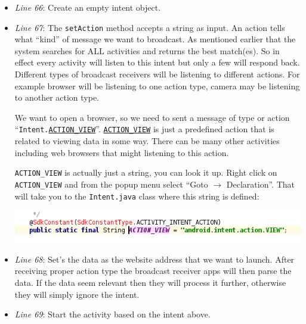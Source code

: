 \begin{itemize}
	\item \textit{Line 66}: Create an empty intent object.
	
	\item \textit{Line 67}: The \texttt{setAction} method accepts a string as input. An action tells what ``kind'' of message we want to broadcast. As mentioned earlier that the system searches for ALL activities and returns the best match(es). So in effect every activity will listen to this intent but only a few will respond back. Different types of broadcast receivers will be listening to different actions. For example browser will be listening to one action type,
	camera may be listening to another action type.
	
	We want to open a browser, so we need to sent a message of type or action
	``\texttt{Intent.}\href{https://developer.android.com/reference/android/content/Intent.html#ACTION_VIEW}{\texttt{ACTION\_VIEW}}''. \href{https://developer.android.com/reference/android/content/Intent.html#ACTION_VIEW}{\texttt{ACTION\_VIEW}} is just a predefined action that is related to viewing data in some way. There can be many other activities including web browsers that might listening to this action. 
	
	\texttt{ACTION\_VIEW} is actually just a string, you can look it up. Right click on \texttt{ACTION\_VIEW} and from the popup menu select ``Goto $\rightarrow$ Declaration''. That will take you to the \texttt{Intent.java} class where this string is defined:
	
	\begin{center}
		\includegraphics[scale=0.4]{chapters/ch09/images/25}
	\end{center}
	
	\item \textit{Line 68}: Set's the data as the website address that we want to launch. After receiving proper action type the broadcast receiver apps will then parse the data. If the data seem relevant then they will process it further, otherwise they will simply ignore the intent.
	
	\item \textit{Line 69}: Start the activity based on the intent above.
	
\end{itemize}

